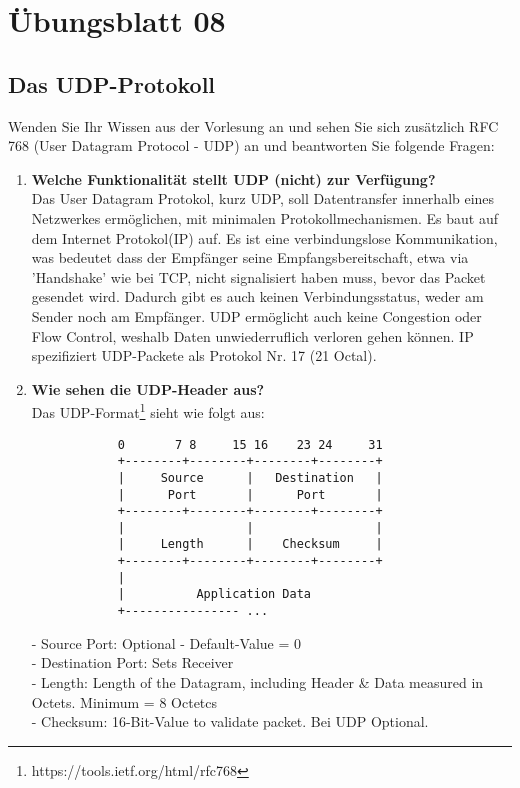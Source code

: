 \documentclass[11pt]{article}
\begin{document}
    \section{Übungsblatt 08}
    \subsection{Das UDP-Protokoll}
    Wenden Sie Ihr Wissen aus der Vorlesung an und sehen Sie sich zusätzlich RFC 768 (User Datagram
    Protocol - UDP) an und beantworten Sie folgende Fragen:
    \begin{enumerate}[label=\textbf{\alph*}.)]
        \item \textbf{Welche Funktionalität stellt UDP (nicht) zur Verfügung?}\\
        Das User Datagram Protokol, kurz UDP, soll Datentransfer innerhalb eines Netzwerkes ermöglichen, mit minimalen
        Protokollmechanismen. Es baut auf dem Internet Protokol(IP) auf.
        Es ist eine verbindungslose Kommunikation, was bedeutet dass der Empfänger seine
        Empfangsbereitschaft, etwa via 'Handshake' wie bei TCP, nicht signalisiert haben muss, bevor das Packet gesendet wird.
        Dadurch gibt es auch keinen Verbindungsstatus, weder am Sender noch am Empfänger.
        UDP ermöglicht auch keine Congestion oder Flow Control, weshalb Daten unwiederruflich verloren gehen können.
        IP spezifiziert UDP-Packete als Protokol Nr. 17 (21 Octal).


        \item \textbf{Wie sehen die UDP-Header aus?}\\
        Das UDP-Format\footnote[1]{https://tools.ietf.org/html/rfc768} sieht wie folgt aus:
        \begin{verbatim}
            0       7 8     15 16    23 24     31
            +--------+--------+--------+--------+
            |     Source      |   Destination   |
            |      Port       |      Port       |
            +--------+--------+--------+--------+
            |                 |                 |
            |     Length      |    Checksum     |
            +--------+--------+--------+--------+
            |
            |          Application Data
            +---------------- ...
        \end{verbatim}
        \begin{addmargin}[1em]{1em}
            - Source Port: Optional - Default-Value = 0\\
            - Destination Port: Sets Receiver\\
            - Length: Length of the Datagram, including Header \& Data measured in Octets. Minimum = 8 Octetcs\\
            - Checksum: 16-Bit-Value to validate packet. Bei UDP Optional.
        \end{addmargin}


\end{enumerate}
\end{document}
